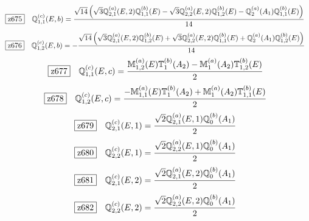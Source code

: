 \documentclass[fleqn,10pt,landscape]{jsarticle}
\begin{document}
\begin{dmath*}
\hspace*{3mm}\fbox{z675}\quad \mathbb{Q}_{1,1}^{(c)}(E,b)=\frac{\sqrt{14} \left(\sqrt{3} \mathbb{Q}_{2,1}^{(a)}(E,2) \mathbb{Q}_{1,1}^{(b)}(E) - \sqrt{3} \mathbb{Q}_{2,2}^{(a)}(E,2) \mathbb{Q}_{1,2}^{(b)}(E) - \mathbb{Q}_{2}^{(a)}(A_{1}) \mathbb{Q}_{1,1}^{(b)}(E)\right)}{14}
\end{dmath*}
\begin{dmath*}
\hspace*{3mm}\fbox{z676}\quad \mathbb{Q}_{1,2}^{(c)}(E,b)=- \frac{\sqrt{14} \left(\sqrt{3} \mathbb{Q}_{2,1}^{(a)}(E,2) \mathbb{Q}_{1,2}^{(b)}(E) + \sqrt{3} \mathbb{Q}_{2,2}^{(a)}(E,2) \mathbb{Q}_{1,1}^{(b)}(E) + \mathbb{Q}_{2}^{(a)}(A_{1}) \mathbb{Q}_{1,2}^{(b)}(E)\right)}{14}
\end{dmath*}
\begin{dmath*}
\hspace*{3mm}\fbox{z677}\quad \mathbb{Q}_{1,1}^{(c)}(E,c)=\frac{\mathbb{M}_{1,2}^{(a)}(E) \mathbb{T}_{1}^{(b)}(A_{2}) - \mathbb{M}_{1}^{(a)}(A_{2}) \mathbb{T}_{1,2}^{(b)}(E)}{2}
\end{dmath*}
\begin{dmath*}
\hspace*{3mm}\fbox{z678}\quad \mathbb{Q}_{1,2}^{(c)}(E,c)=\frac{- \mathbb{M}_{1,1}^{(a)}(E) \mathbb{T}_{1}^{(b)}(A_{2}) + \mathbb{M}_{1}^{(a)}(A_{2}) \mathbb{T}_{1,1}^{(b)}(E)}{2}
\end{dmath*}
\begin{dmath*}
\hspace*{3mm}\fbox{z679}\quad \mathbb{Q}_{2,1}^{(c)}(E,1)=\frac{\sqrt{2} \mathbb{Q}_{2,1}^{(a)}(E,1) \mathbb{Q}_{0}^{(b)}(A_{1})}{2}
\end{dmath*}
\begin{dmath*}
\hspace*{3mm}\fbox{z680}\quad \mathbb{Q}_{2,2}^{(c)}(E,1)=\frac{\sqrt{2} \mathbb{Q}_{2,2}^{(a)}(E,1) \mathbb{Q}_{0}^{(b)}(A_{1})}{2}
\end{dmath*}
\begin{dmath*}
\hspace*{3mm}\fbox{z681}\quad \mathbb{Q}_{2,1}^{(c)}(E,2)=\frac{\sqrt{2} \mathbb{Q}_{2,1}^{(a)}(E,2) \mathbb{Q}_{0}^{(b)}(A_{1})}{2}
\end{dmath*}
\begin{dmath*}
\hspace*{3mm}\fbox{z682}\quad \mathbb{Q}_{2,2}^{(c)}(E,2)=\frac{\sqrt{2} \mathbb{Q}_{2,2}^{(a)}(E,2) \mathbb{Q}_{0}^{(b)}(A_{1})}{2}
\end{dmath*}
\end{document}
